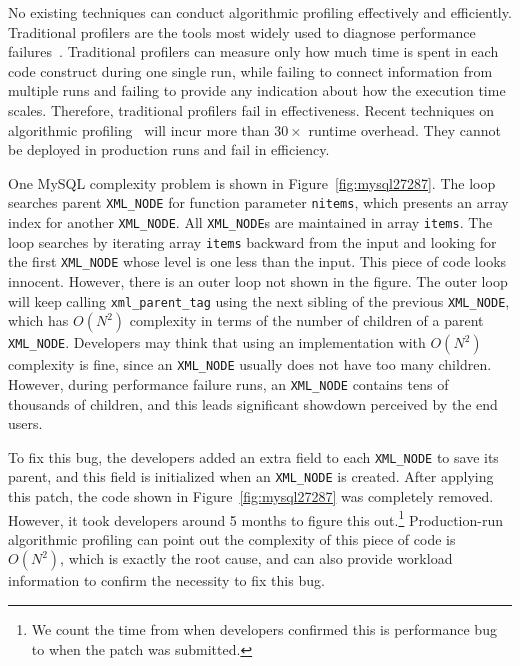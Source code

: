 No existing techniques can conduct algorithmic profiling effectively and efficiently. 
Traditional profilers are the tools most widely used to
diagnose performance failures~\cite{gprof,oprofile}.
Traditional profilers can measure only how much time 
is spent in each code construct during one single run,
while failing to connect information from multiple runs
and failing to provide any indication about how the execution time scales.
Therefore, traditional profilers fail in effectiveness.
Recent techniques on algorithmic 
profiling~\cite{Aprof1,Aprof2,AlgoProf} will incur more than $30\times$ runtime overhead.
They cannot be deployed in production runs and fail in efficiency. 






One MySQL complexity problem is shown in Figure~\ref{fig:mysql27287}.
The loop searches parent \texttt{XML\_NODE} for function parameter \texttt{nitems},
which presents an array index for another \texttt{XML\_NODE}.
All \texttt{XML\_NODE}s are maintained in array \texttt{items}.
The loop searches by iterating array \texttt{items}
backward from the input and looking for the first \texttt{XML\_NODE}
whose level is one less than the input.
This piece of code looks innocent.
However, there is an outer loop not shown in the figure.
The outer loop will keep calling \texttt{xml\_parent\_tag} using
the next sibling of the previous \texttt{XML\_NODE},
which has $O(N^2)$ complexity in terms of the number of children of a parent \texttt{XML\_NODE}.
Developers may think that using an implementation with $O(N^2)$ complexity is fine,
since an \texttt{XML\_NODE} usually does not have too many children.
However, during performance failure runs,
an \texttt{XML\_NODE} contains tens of thousands of children,
and this leads significant showdown perceived by the end users.

To fix this bug, the developers added an extra field to each \texttt{XML\_NODE} to save its parent,
and this field is initialized when an \texttt{XML\_NODE} is created.
After applying this patch, the code shown in Figure~\ref{fig:mysql27287} was completely removed.
However, it took developers around 5 months to figure this
out.\footnote{We count the time from when developers confirmed this is performance bug
to when the patch was submitted.}
Production-run algorithmic profiling 
can point out the complexity of this piece of code is $O(N^2)$, 
which is exactly the root cause, 
and can also provide workload information 
to confirm the necessity to fix this bug.


